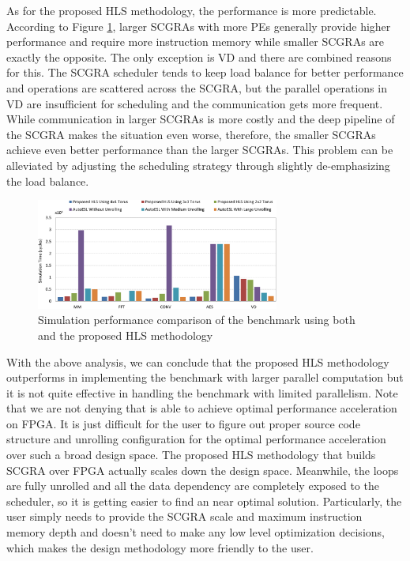 As for the proposed HLS methodology, the performance is more predictable. According to Figure \ref{fig:sim_perf}, larger SCGRAs with more PEs generally provide higher performance and require more instruction memory while smaller SCGRAs are exactly the opposite. The only exception is VD and there are combined reasons for this. The SCGRA scheduler tends to keep load balance for better performance and operations are scattered across the SCGRA, but the parallel operations in VD are insufficient for scheduling and the communication gets more frequent. While communication in larger SCGRAs is more costly and the deep pipeline of the SCGRA makes the situation even worse, therefore, the smaller SCGRAs achieve even better performance than the larger SCGRAs. This problem can be alleviated by adjusting the scheduling strategy through slightly de-emphasizing the load balance.

\begin{figure}[h]
\centering
\includegraphics[width=8cm]{sim_perf}
\vspace{-1em}
\caption{Simulation performance comparison of the benchmark using both \autoesl and the proposed HLS methodology}
\label{fig:sim_perf}
\vspace{-1em}
\end{figure}

With the above analysis, we can conclude that the proposed HLS methodology outperforms \autoesl in implementing the benchmark with larger parallel computation but it is not quite effective in handling the benchmark with limited parallelism. Note that we are not denying that \autoesl is able to achieve optimal performance acceleration on FPGA. It is just difficult for the user to figure out proper source code structure and unrolling configuration for the optimal performance acceleration over such a broad design space. The proposed HLS methodology that builds SCGRA over FPGA actually scales down the design space. Meanwhile, the loops are fully unrolled and all the data dependency are completely exposed to the scheduler, so it is getting easier to find an near optimal solution. Particularly, the user simply needs to provide the SCGRA scale and maximum instruction memory depth and doesn't need to make any low level optimization decisions, which makes the design methodology more friendly to the user. 

